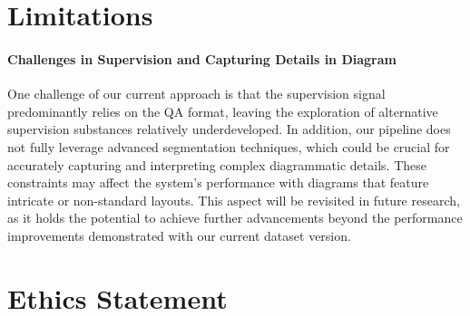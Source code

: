 \section*{Limitations}

\paragraph{Challenges in Supervision and Capturing Details in Diagram}
One challenge of our current approach is that the supervision signal predominantly relies on the QA format, leaving the exploration of alternative supervision substances relatively underdeveloped. In addition, our pipeline does not fully leverage advanced segmentation techniques, which could be crucial for accurately capturing and interpreting complex diagrammatic details. These constraints may affect the system’s performance with diagrams that feature intricate or non-standard layouts. This aspect will be revisited in future research, as it holds the potential to achieve further advancements beyond the performance improvements demonstrated with our current dataset version.



\section*{Ethics Statement}
